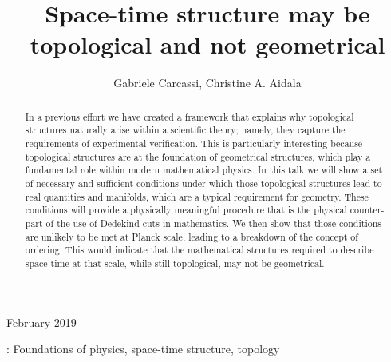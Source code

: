 \documentclass[12pt]{iopart}
\begin{document}
\title{Space-time structure may be topological and not geometrical}

\author{Gabriele Carcassi, Christine A. Aidala}

\address{Physics Department, University of Michigan, 450 Church Street\\
	Ann Arbor, MI 48109-1040,
	United States}
\vspace{10pt}
\begin{indented}
\item[]February 2019
\end{indented}

\begin{abstract}
In a previous effort we have created a framework that explains why topological structures naturally arise within a scientific theory; namely, they capture the requirements of experimental verification. This is particularly interesting because topological structures are at the foundation of geometrical structures, which play a fundamental role within modern mathematical physics. In this talk we will show a set of necessary and sufficient conditions under which those topological structures lead to real quantities and manifolds, which are a typical requirement for geometry. These conditions will provide a physically meaningful procedure that is the physical counter-part of the use of Dedekind cuts in mathematics. We then show that those conditions are unlikely to be met at Planck scale, leading to a breakdown of the concept of ordering. This would indicate that the mathematical structures required to describe space-time at that scale, while still topological, may not be geometrical.
\end{abstract}

%
: Foundations of physics, space-time structure, topology

%
\submitto{\PS}
%
% 
%
\end{document}
